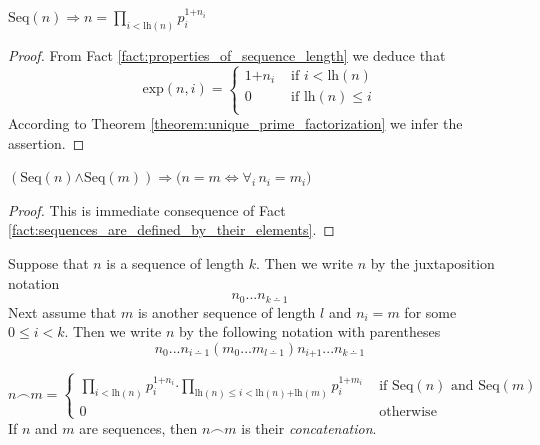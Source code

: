 \documentclass[10pt]{amsart}
\newcommand{\mforall}{\boldsymbol{\forall}}
\newcommand{\mra}{\boldsymbol{\Rightarrow}}
\newcommand{\mequiv}{\boldsymbol{\Leftrightarrow}}
\newcommand{\mand}{\boldsymbol{\wedge}}
\newcommand{\mle}{\boldsymbol{<}}
\newcommand{\mleq}{\boldsymbol{\leq}}
\newcommand{\meq}{\boldsymbol{=}}
\newcommand{\mplus}{\boldsymbol{+}}
\newcommand{\mdot}{\boldsymbol{\cdot}}
\begin{document}
\begin{fact}\label{fact:sequences_are_defined_by_their_elements}
	$\mathrm{Seq}(n) \mra n \meq \prod_{i \mle \mathrm{lh}(n)}p_i^{1\mplus n_i}$
\end{fact}
\begin{proof}
	From Fact \ref{fact:properties_of_sequence_length} we deduce that
	$$\mathrm{exp}(n,i) \meq \begin{cases}
			1 \mplus n_i & \mbox{ if }i \mle \mathrm{lh}(n)    \\
			0        & \mbox{ if }\mathrm{lh}(n) \mleq i \\
		\end{cases}$$
	According to Theorem \ref{theorem:unique_prime_factorization} we infer the assertion.
\end{proof}

\begin{corollary}\label{corollary:extensionality_of_sequences}
	$\left(\mathrm{Seq}(n) \mand \mathrm{Seq}(m)\right) \mra \big(n \meq m \mequiv \mforall_i\,n_i \meq m_i\big)$
\end{corollary}
\begin{proof}
	This is immediate consequence of Fact \ref{fact:sequences_are_defined_by_their_elements}.
\end{proof}

\begin{remark}\label{remark:notation_for_sequences}
  Suppose that $n$ is a sequence of length $k$. Then we write $n$ by the juxtaposition notation 
  $$n_0...n_{k\dotminus 1}$$
  Next assume that $m$ is another sequence of length $l$ and $n_i \meq m $ for some $0 \mleq i \mle k$. Then we write $n$ by the following notation with parentheses 
  $$n_0...n_{i\dotminus 1}\left(m_0...m_{l\dotminus 1}\right)n_{i \mplus 1}...n_{k\dotminus 1}$$
\end{remark}

\begin{definition}
	$$n \frown m \meq \begin{cases}
			\prod_{i \mle \mathrm{lh}(n)}p_i^{1 \mplus n_i}\mdot \prod_{\mathrm{lh}(n) \mleq i \mle \mathrm{lh}(n) \mplus \mathrm{lh}(m)}p_i^{1 \mplus m_i} & \mbox{ if }\mathrm{Seq}(n)\mbox{ and }\mathrm{Seq}(m) \\[0.3em]
			0                                                                                                                           & \mbox{ otherwise }
		\end{cases}
	$$
	If $n$ and $m$ are sequences, then $n \frown m$ is their \textit{concatenation}.
\end{definition}
\end{document}
